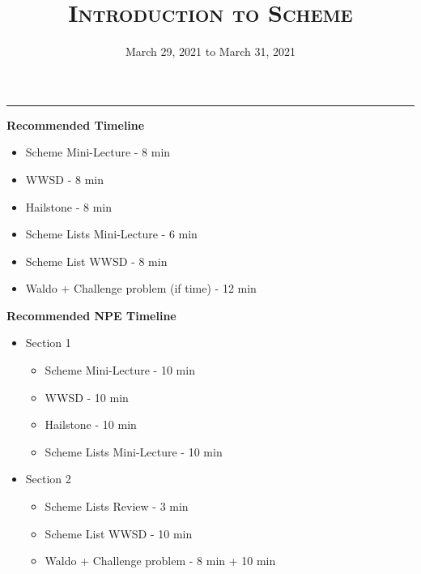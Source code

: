 \documentclass{exam}
\title{\textsc{Introduction to Scheme}}
\date{March 29, 2021 to March 31, 2021}
\begin{document}
\maketitle
\rule{\textwidth}{0.15em}
\fontsize{12}{15}\selectfont

\begin{guide}
\begin{blocksection}
\textbf{Recommended Timeline}
\begin{itemize}
  \item Scheme Mini-Lecture - 8 min
  \item WWSD - 8 min
  \item Hailstone - 8 min
  \item Scheme Lists Mini-Lecture - 6 min
  \item Scheme List WWSD - 8 min
  \item Waldo + Challenge problem (if time) - 12 min
\end{itemize}
\end{blocksection}
\end{guide}

\begin{guide}
\begin{blocksection}
\textbf{Recommended NPE Timeline}
  \begin{itemize}
  \item Section 1
  \begin{itemize}
    \item Scheme Mini-Lecture - 10 min
    \item WWSD - 10 min
    \item Hailstone - 10 min
    \item Scheme Lists Mini-Lecture - 10 min
  \end{itemize}
  \item Section 2
  \begin{itemize}
    \item Scheme Lists Review - 3 min
    \item Scheme List WWSD - 10 min
    \item Waldo + Challenge problem - 8 min + 10 min
  \end{itemize}
\end{itemize}
\end{blocksection}
\end{guide}
\end{document}
